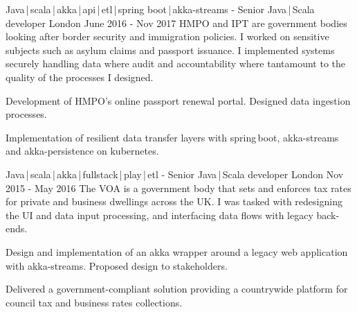 \begin{cventries}
    \cventry
    {Java\,|\,scala\,|\,akka\,|\,api\,|\,etl\,|\,spring boot\,|\,akka-streams}
    { - Senior Java\,|\,Scala developer}
    {London}
    {June 2016 - Nov 2017}
    {HMPO and IPT are government bodies looking after border security and immigration policies. I worked on sensitive subjects such as asylum claims and passport issuance. I implemented systems securely handling data where audit and accountability where tantamount to the quality of the processes I designed.}
    {
        \begin{cvitems}
            \item{Development of HMPO's online passport renewal portal. Designed data ingestion processes.}
            \item{Implementation of resilient data transfer layers with spring\,boot, akka-streams and akka-persistence on kubernetes.}
        \end{cvitems}
    }

    \cventry
    {Java\,|\,scala\,|\,akka\,|\,fullstack\,|\,play\,|\,etl}
    { - Senior Java\,|\,Scala developer}
    {London}
    {Nov 2015 - May 2016}
    {The VOA is a government body that sets and enforces tax rates for private and business dwellings across the UK. I was tasked with redesigning the UI and data input processing, and interfacing data flows with legacy back-ends. }
    {
        \begin{cvitems}
            \item{Design and implementation of an akka wrapper around a legacy web application with akka-streams. Proposed design to stakeholders.}
            \item{Delivered a government-compliant solution providing a countrywide platform for council tax and business rates collections.}
        \end{cvitems}
    }


\end{cventries}
